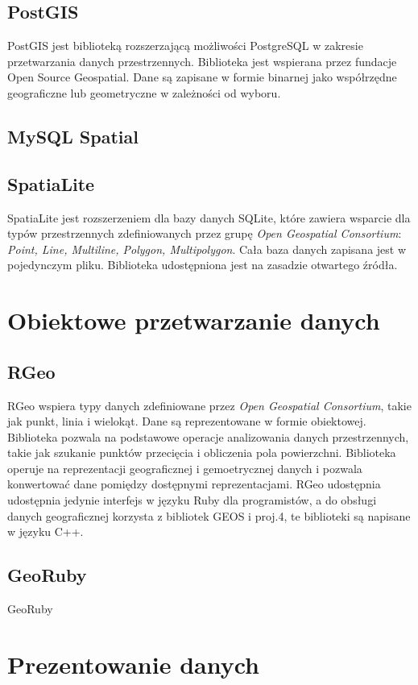 \documentclass[printmode]{mgr}
\begin{document}
\subsection{PostGIS}
PostGIS jest biblioteką rozszerzającą możliwości PostgreSQL w zakresie przetwarzania danych przestrzennych. Biblioteka jest wspierana przez fundacje Open Source Geospatial. Dane są zapisane w formie binarnej jako współrzędne geograficzne lub geometryczne w zależności od wyboru. 
\subsection{MySQL Spatial}
\subsection{SpatiaLite}
SpatiaLite jest rozszerzeniem dla bazy danych SQLite, które zawiera wsparcie dla typów przestrzennych zdefiniowanych przez grupę \textit{Open Geospatial Consortium}\cite{doc_spatialite}: \textit{Point, Line, Multiline, Polygon, Multipolygon}. Cała baza danych zapisana jest w pojedynczym pliku. Biblioteka udostępniona jest na zasadzie otwartego źródła.

\section{Obiektowe przetwarzanie danych}
\subsection{RGeo}
RGeo wspiera typy danych zdefiniowane przez \textit{Open Geospatial Consortium}, takie jak punkt, linia i wielokąt. Dane są reprezentowane w formie obiektowej. Biblioteka pozwala na podstawowe operacje analizowania danych przestrzennych, takie jak szukanie punktów przecięcia i obliczenia pola powierzchni. Biblioteka operuje na reprezentacji geograficznej i gemoetrycznej danych i pozwala konwertować dane pomiędzy dostępnymi reprezentacjami. RGeo udostępnia udostępnia jedynie interfejs w języku Ruby dla programistów, a do obsługi danych geograficznej korzysta z bibliotek GEOS i proj.4, te biblioteki są napisane w języku C++.

\subsection{GeoRuby}
GeoRuby 

\section{Prezentowanie danych}
\label{sec:maps-tools}
\end{document}
